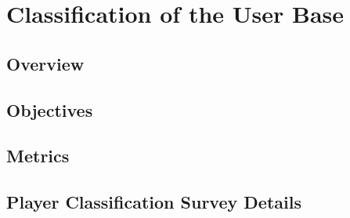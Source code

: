 
\section{Classification of the User Base}

\subsection{Overview}


\subsection{Objectives}


\subsection{Metrics}



\subsection{Player Classification Survey Details}

